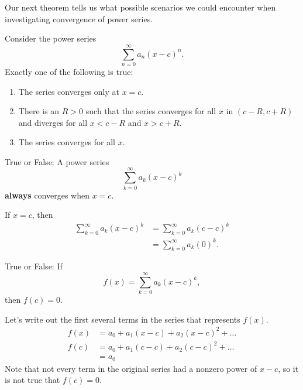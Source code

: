 \documentclass{ximera}
\begin{document}
Our next theorem tells us what possible scenarios we could encounter
when investigating convergence of power series.

\begin{theorem}
  Consider the power series
  \[
  \sum_{n=0}^\infty a_n(x-c)^n.
  \]
  Exactly one of the following is true:
\begin{enumerate}
\item The series converges only at $x=c$.
\item There is an $R>0$ such that the series converges for all $x$ in	
  $(c-R,c+R)$ and diverges for all $x<c-R$ and $x>c+R$.
\item The series converges for all $x$.
\end{enumerate}
\end{theorem}

\begin{question}
  True or False: A power series
  \[
  \sum_{k=0}^\infty a_k(x-c)^k
  \]
  \textbf{always} converges when $x=c$.
  \begin{prompt}
    \begin{multipleChoice}
    \end{multipleChoice}
  \end{prompt}
  \begin{feedback}
    If $x=c$, then
    \begin{align*}
      \sum_{k=0}^\infty a_k(x-c)^k &= \sum_{k=0}^\infty a_k(c-c)^k \\
      &= \sum_{k=0}^\infty a_k(0)^k.
    \end{align*}
  \end{feedback}
  \begin{question}
    True or False: If 
    \[
    f(x) = \sum_{k=0}^\infty a_k(x-c)^k,
    \]
    then $f(c) = 0$. 
  \begin{prompt}
    \begin{multipleChoice}
    \end{multipleChoice}
  \end{prompt}
  \begin{feedback}
  
  Let's write out the first several terms in the series that represents $f(x)$.
    \begin{align*}
      f(x) &= a_0+a_1(x-c)+a_2(x-c)^2+\ldots \\
      f(c) &= a_0+a_1(c-c)+a_2(c-c)^2+\ldots \\
      &= a_0
    \end{align*}
    Note that not every term in the original series had a nonzero power of $x-c$, so it is not true that $f(c)=0$. 
  \end{feedback} 
\end{question}
\end{question}
\end{document}
